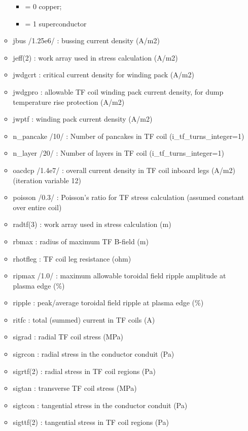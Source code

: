 \documentclass[
]{article}
\providecommand{\tightlist}{%
  \setlength{\itemsep}{0pt}\setlength{\parskip}{0pt}}
\begin{document}
\begin{itemize}
\begin{itemize}
    \begin{itemize}
    \tightlist
    \item
      = 0 copper;
    \item
      = 1 superconductor
    \end{itemize}
  \item
    jbus /1.25e6/ : bussing current density (A/m2)
  \item
    jeff(2) : work array used in stress calculation (A/m2)
  \item
    jwdgcrt : critical current density for winding pack (A/m2)
  \item
    jwdgpro : allowable TF coil winding pack current density, for dump
    temperature rise protection (A/m2)
  \item
    jwptf : winding pack current density (A/m2)
  \item
    n\_pancake /10/ : Number of pancakes in TF coil
    (i\_tf\_turns\_integer=1)
  \item
    n\_layer /20/ : Number of layers in TF coil
    (i\_tf\_turns\_integer=1)
  \item
    oacdcp /1.4e7/ : overall current density in TF coil inboard legs
    (A/m2) (iteration variable 12)
  \item
    poisson /0.3/ : Poisson's ratio for TF stress calculation (assumed
    constant over entire coil)
  \item
    radtf(3) : work array used in stress calculation (m)
  \item
    rbmax : radius of maximum TF B-field (m)
  \item
    rhotfleg : TF coil leg resistance (ohm)
  \item
    ripmax /1.0/ : maximum allowable toroidal field ripple amplitude at
    plasma edge (\%)
  \item
    ripple : peak/average toroidal field ripple at plasma edge (\%)
  \item
    ritfc : total (summed) current in TF coils (A)
  \item
    sigrad : radial TF coil stress (MPa)
  \item
    sigrcon : radial stress in the conductor conduit (Pa)
  \item
    sigrtf(2) : radial stress in TF coil regions (Pa)
  \item
    sigtan : transverse TF coil stress (MPa)
  \item
    sigtcon : tangential stress in the conductor conduit (Pa)
  \item
    sigttf(2) : tangential stress in TF coil regions (Pa)

\end{itemize}
\end{itemize}
\end{document}
